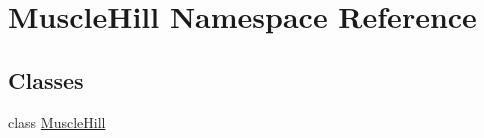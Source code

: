 \hypertarget{namespace_muscle_hill}{}\section{Muscle\+Hill Namespace Reference}
\label{namespace_muscle_hill}
\subsection*{Classes}
\begin{DoxyCompactItemize}
\item 
class \hyperlink{class_muscle_hill_1_1_muscle_hill}{Muscle\+Hill}
\end{DoxyCompactItemize}
